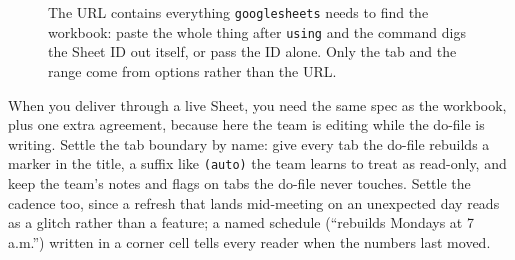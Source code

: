 \documentclass[
    a4paper,
    fontsize=10pt,
    twoside=true,
    numbers=noenddot,
]{kaobook}
\begin{document}
\begin{figure}[htbp]
\centering
{}
\caption[Anatomy of a Google Sheets URL]{The URL contains everything \texttt{googlesheets} needs to find the workbook: paste the whole thing after \texttt{using} and the command digs the Sheet ID out itself, or pass the ID alone. Only the tab and the range come from options rather than the URL.}
\label{fig:ch11-viz-sheeturl}
\end{figure}

When you deliver through a live Sheet, you need the same spec as the workbook, plus one extra agreement, because here the team is editing while the do-file is writing. Settle the tab boundary by name: give every tab the do-file rebuilds a marker in the title, a suffix like \texttt{(auto)} the team learns to treat as read-only, and keep the team's notes and flags on tabs the do-file never touches. Settle the cadence too, since a refresh that lands mid-meeting on an unexpected day reads as a glitch rather than a feature; a named schedule (\enquote{rebuilds Mondays at 7 a.m.}) written in a corner cell tells every reader when the numbers last moved.
\end{document}
